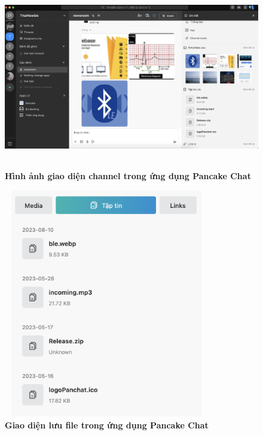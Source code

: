 \begin{figure}[H]
  \centering
  \includegraphics[width=14cm,height=8cm]{Images/pancake/panchat_channel.png}
  \caption[Hình ảnh giao diện channel trong ứng dụng Pancake Chat]{\bfseries \fontsize{12pt}{0pt}
  \selectfont Hình ảnh giao diện channel trong ứng dụng Pancake Chat}
  \label{pancake_chat_channel} 
\end{figure}


\begin{figure}[H]
  \centering
  \includegraphics[width=9cm,height=10cm]{Images/pancake/panchat_files.png}
  \caption[Giao diện lưu file trong ứng dụng Pancake Chat]{\bfseries \fontsize{12pt}{0pt}
  \selectfont Giao diện lưu file trong ứng dụng Pancake Chat}
  \label{panchat_files} 
\end{figure}

